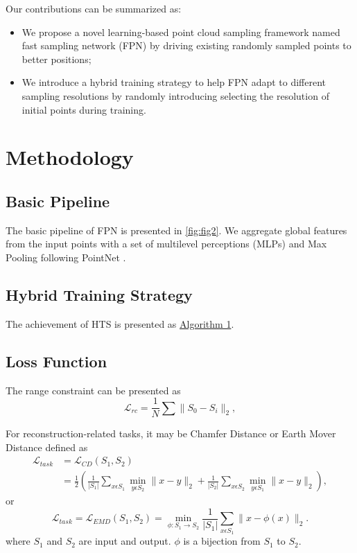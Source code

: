 \documentclass[a4paper,10pt]{article}
\begin{document}
\begin{multicols}{2}
Our contributions can be summarized as:
\begin{itemize}
 \item We propose a novel learning-based point cloud sampling framework named fast sampling network (FPN) by driving existing randomly sampled points to better positions;
 \item We introduce a hybrid training strategy to help FPN adapt to different sampling resolutions by randomly introducing selecting the resolution of initial points during training.
\end{itemize}


\section{Methodology}
\subsection{Basic Pipeline}
The basic pipeline of FPN is presented in \autoref{fig:fig2}. We aggregate global features from the input points with a set of multilevel perceptions (MLPs) and Max Pooling following PointNet \cite{qi2017pointnet}.

\subsection{Hybrid Training Strategy}
The achievement of HTS is presented as \hyperref[alg:algo-1]{Algorithm 1}.

\subsection{Loss Function}
The range constraint can be presented as
\begin{equation}
 \mathcal{L}_{rc} = \frac{1}{N}\sum \|S_0 - S_i\|_2,
\end{equation}

For reconstruction-related tasks, it may be Chamfer Distance or Earth Mover Distance \cite{fan2017point} deﬁned as
\begin{equation} \label{eqn:eqn1}
\begin{split}
\mathcal{L}_{task} & = \mathcal{L}_{CD}(S_1, S_2) \\
& = \frac{1}{2} \left (\frac{1}{|S_1|}\sum_{x \epsilon S_1}\min_{y \epsilon S_2} \|x-y\|_2 + \frac{1}{|S_2|}\sum_{x \epsilon S_2}\min_{y \epsilon S_1} \|x-y\|_2 \right ),
\end{split}
\end{equation}
or
\begin{equation}
 \mathcal{L}_{task} = \mathcal{L}_{EMD}(S_1, S_2) = \min_{\phi : S_1 \rightarrow S_2} \frac{1}{|S_1|}\sum_{x \epsilon S_1} \|x-\phi(x) \|_2.
\end{equation}
where $S_1$ and $S_2$ are input and output. $\phi$ is a bijection from $S_1$ to $S_2$.

\end{multicols}
\end{document}
